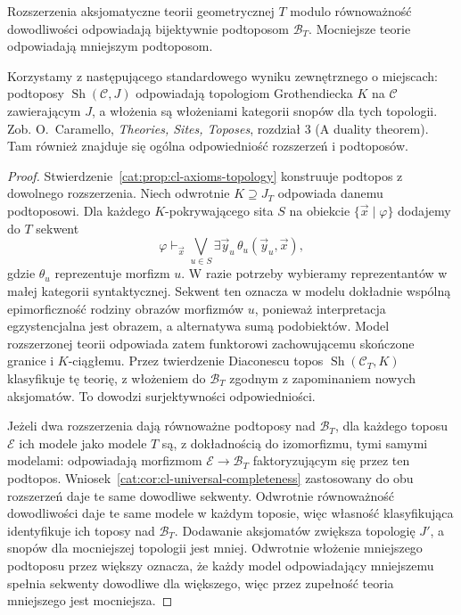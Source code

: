 \begin{twierdzenie}\label{cat:thm:cl-quotient-subtopos}
Rozszerzenia aksjomatyczne teorii geometrycznej $T$ modulo równoważność dowodliwości odpowiadają bijektywnie podtoposom $\mathcal B_T$. Mocniejsze teorie odpowiadają mniejszym podtoposom.
\end{twierdzenie}

Korzystamy z następującego standardowego wyniku zewnętrznego o miejscach: podtoposy $\operatorname{Sh}(\mathcal C,J)$ odpowiadają topologiom Grothendiecka $K$ na $\mathcal C$ zawierającym $J$, a włożenia są włożeniami kategorii snopów dla tych topologii. Zob. O.~Caramello, \emph{Theories, Sites, Toposes}, rozdział 3 (A duality theorem). Tam również znajduje się ogólna odpowiedniość rozszerzeń i podtoposów.

\begin{proof}
Stwierdzenie~\ref{cat:prop:cl-axioms-topology} konstruuje podtopos z dowolnego rozszerzenia. Niech odwrotnie $K\supseteq J_T$ odpowiada danemu podtoposowi. Dla każdego $K$-pokrywającego sita $S$ na obiekcie $\{\vec x\mid\varphi\}$ dodajemy do $T$ sekwent
\[
 \varphi\vdash_{\vec x}
 \bigvee_{u\in S}\exists\vec y_u\,\theta_u(\vec y_u,\vec x),
\]
gdzie $\theta_u$ reprezentuje morfizm $u$. W razie potrzeby wybieramy reprezentantów w małej kategorii syntaktycznej. Sekwent ten oznacza w modelu dokładnie wspólną epimorficzność rodziny obrazów morfizmów $u$, ponieważ interpretacja egzystencjalna jest obrazem, a alternatywa sumą podobiektów. Model rozszerzonej teorii odpowiada zatem funktorowi zachowującemu skończone granice i $K$-ciągłemu. Przez twierdzenie Diaconescu topos $\operatorname{Sh}(\mathcal C_T,K)$ klasyfikuje tę teorię, z włożeniem do $\mathcal B_T$ zgodnym z zapominaniem nowych aksjomatów. To dowodzi surjektywności odpowiedniości.

Jeżeli dwa rozszerzenia dają równoważne podtoposy nad $\mathcal B_T$, dla każdego toposu $\mathcal E$ ich modele jako modele $T$ są, z dokładnością do izomorfizmu, tymi samymi modelami: odpowiadają morfizmom $\mathcal E\to\mathcal B_T$ faktoryzującym się przez ten podtopos. Wniosek~\ref{cat:cor:cl-universal-completeness} zastosowany do obu rozszerzeń daje te same dowodliwe sekwenty. Odwrotnie równoważność dowodliwości daje te same modele w każdym toposie, więc własność klasyfikująca identyfikuje ich toposy nad $\mathcal B_T$. Dodawanie aksjomatów zwiększa topologię $J'$, a snopów dla mocniejszej topologii jest mniej. Odwrotnie włożenie mniejszego podtoposu przez większy oznacza, że każdy model odpowiadający mniejszemu spełnia sekwenty dowodliwe dla większego, więc przez zupełność teoria mniejszego jest mocniejsza.
\end{proof}

